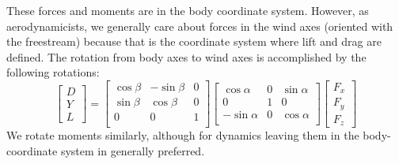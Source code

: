 \documentclass{article}
\begin{document}
These forces and moments are in the body coordinate system.  However, as aerodynamicists, we generally care about forces in the wind axes (oriented with the freestream) because that is the coordinate system where lift and drag are defined.  The rotation from body axes to wind axes is accomplished by the following rotations:
\begin{equation}
\begin{bmatrix}
D\\
Y\\
L
\end{bmatrix}
= 
\begin{bmatrix}
\cos\beta & -\sin\beta & 0 \\
\sin\beta & \cos\beta & 0 \\
0 & 0 & 1\\
\end{bmatrix}
\begin{bmatrix}
\cos\alpha & 0 & \sin\alpha \\
0 & 1 & 0\\
-\sin\alpha & 0 & \cos\alpha \\
\end{bmatrix}
\begin{bmatrix}
F_x\\
F_y\\
F_z
\end{bmatrix}
\label{eq:forceswindframe}
\end{equation}
We rotate moments similarly, although for dynamics leaving them in the body-coordinate system in generally preferred.


\end{document}
